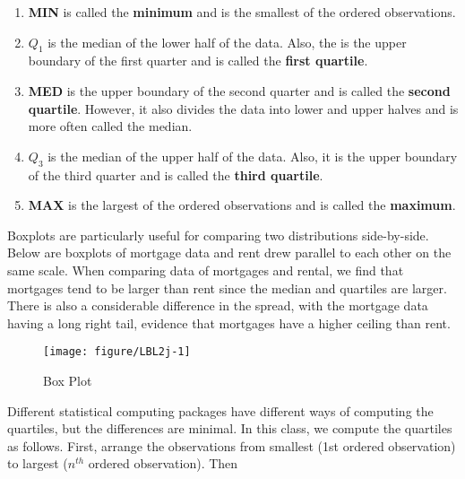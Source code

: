 \documentclass[11pt]{book}\usepackage[]{graphicx}\usepackage[]{color}
\begin{document}
{\small{
\begin{enumerate}
\item	\textbf{MIN} is called the \textbf{minimum} and is the smallest of the ordered observations.
\item	\textbf{$Q_1$} is the median of the lower half of the data.  Also, the is the upper boundary of the first quarter and is called the \textbf{first quartile}.
\item	\textbf{MED} is the upper boundary of the second quarter and is called the \textbf{second quartile}.  However, it also divides the data into lower and upper halves and is more often called the median.
\item	\textbf{$Q_3$} is the median of the upper half of the data.  Also, it is the upper boundary of the third quarter and is called the \textbf{third quartile}.
\item	\textbf{MAX} is the largest of the ordered observations and is called the \textbf{maximum}.
\end{enumerate}
}}

Boxplots are particularly useful for comparing two distributions side-by-side.  Below are boxplots of mortgage data and rent drew parallel to each other on the same scale.  When comparing data of mortgages and rental, we find that mortgages tend to be larger than rent since the median and quartiles are larger.  There is also a considerable difference in the spread, with the mortgage data having a long right tail, evidence that mortgages have a higher ceiling than rent.

\begin{figure}[ht]

\caption{Box Plot }



{\centering \texttt{[image: figure/LBL2j-1]} 

}




\end{figure}

\newpage 

Different statistical computing packages have different ways of computing the quartiles, but the differences are minimal.  In this class, we compute the quartiles as follows.  First, arrange the observations from smallest (1st ordered observation) to largest ($n^{th}$ ordered observation).  Then

\end{document}
